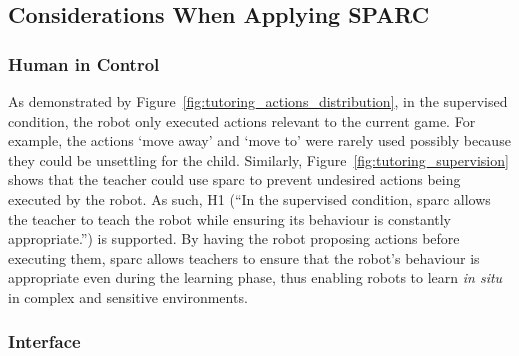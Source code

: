 \subsection{Considerations When Applying SPARC}
\subsubsection{Human in Control}\label{sec:tuto_control}

As demonstrated by Figure~\ref{fig:tutoring_actions_distribution}, in the supervised condition, the robot only executed actions relevant to the current game. For example, the actions `move away' and `move to' were rarely used possibly because they could be unsettling for the child. Similarly, Figure~\ref{fig:tutoring_supervision} shows that the teacher could use \gls{sparc} to prevent undesired actions being executed by the robot. As such, H1 (``In the supervised condition, \gls{sparc} allows the teacher to teach the robot while ensuring its behaviour is constantly appropriate.'') is supported. By having the robot proposing actions before executing them, \gls{sparc} allows teachers to ensure that the robot's behaviour is appropriate even during the learning phase, thus enabling robots to learn \emph{in situ} in complex and sensitive environments.




\subsubsection{Interface}

